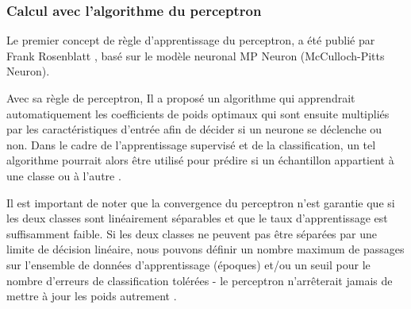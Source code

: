 


	\subsubsection{Calcul avec l'algorithme du perceptron}

Le premier concept de règle d'apprentissage du perceptron, a été publié par Frank Rosenblatt \cite{antoine2018apprentissage}, basé sur le modèle neuronal MP Neuron (McCulloch-Pitts Neuron). 


Avec sa règle de perceptron, Il a proposé un algorithme qui apprendrait automatiquement les coefficients de poids optimaux qui sont ensuite multipliés par les caractéristiques d'entrée afin de décider si un neurone se déclenche ou non. Dans le cadre de l'apprentissage supervisé et de la classification, un tel algorithme pourrait alors être utilisé pour prédire si un échantillon appartient à une classe ou à l'autre \cite{ml2008python}.

Il est important de noter que la convergence du perceptron n'est garantie que si les deux classes sont linéairement séparables et que le taux d'apprentissage %
est suffisamment faible. Si les deux classes ne peuvent pas être séparées par une limite de décision linéaire, nous pouvons définir un nombre maximum de passages sur l'ensemble de données d'apprentissage (époques) et/ou un seuil pour le nombre d'erreurs de classification tolérées - le perceptron n'arrêterait jamais de mettre à jour les poids autrement \cite{freund1999large, ml2008python}.

